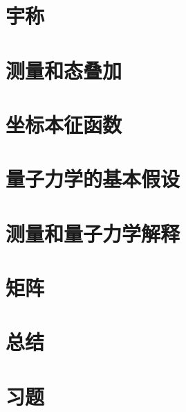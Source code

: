 \section{宇称}
\label{sec:7.5 Parity}













\section{测量和态叠加}
\label{sec:7.6 Measurement and the Superposition of States}

\section{坐标本征函数}
\label{sec:7.7 Position Eigenfunctions}

\section{量子力学的基本假设}
\label{sec:7.8 The Postulates of Quantum Mechanics}

\section{测量和量子力学解释}
\label{sec:7.9 Measurement and the Interpretation of Quantum Mechanics}

\section{矩阵}
\label{sec:7.10 Matrices}

\section*{总结}

\section*{习题}